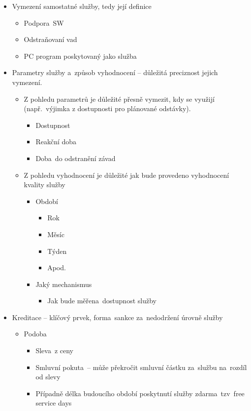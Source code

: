 \begin{itemize}[noitemsep]
    \item Vymezení samostatné služby, tedy její definice
    \begin{itemize}[noitemsep]
        \item Podpora~SW
        \item Odstraňovaní vad
        \item PC program poskytovaný jako služba
    \end{itemize}
    \item Parametry služby a~způsob vyhodnocení -- důležitá preciznost jejich vymezení.
    \begin{itemize}[noitemsep]
        \item Z pohledu parametrů je důležité přesně vymezit, kdy se využijí (např.\ výjimka z dostupnosti pro plánované odstávky).
        \begin{itemize}[noitemsep]
            \item Dostupnost
            \item Reakční doba
            \item Doba~do odstranění závad
        \end{itemize}
        \item  Z pohledu vyhodnocení je důležité jak bude provedeno vyhodnocení kvality služby
        \begin{itemize}[noitemsep]
            \item Období
            \begin{itemize}[noitemsep]
                \item Rok
                \item Měsíc
                \item Týden
                \item Apod.
            \end{itemize}
            \item Jaký mechanismus
            \begin{itemize}[noitemsep]
                \item Jak bude měřena~dostupnost služby
            \end{itemize}
        \end{itemize}
    \end{itemize}
    \item Kreditace -- klíčový prvek, forma~sankce za~nedodržení úrovně služby
    \begin{itemize}[noitemsep]
        \item Podoba
        \begin{itemize}[noitemsep]
            \item  Sleva~z ceny
            \item Smluvní pokuta~-- může překročit smluvní částku za~službu na~rozdíl od slevy
            \item Případně délka budoucího období poskytnutí služby zdarma~tzv~free service days
        \end{itemize}
    \end{itemize}
\end{itemize}

